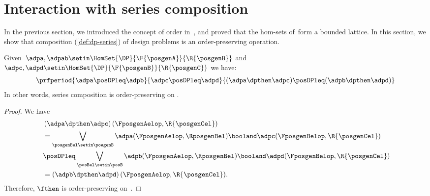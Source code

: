 
\section{Interaction with series composition}
In the previous section, we introduced the concept of order in~\DP, and proved that the hom-sets of~\DP form a bounded lattice.
In this section, we show that composition (\cref{def:dp-series}) of design problems is an order-preserving operation.

\begin{lemma}
    \label{lem:series_pres_order}
    Given~$\adpa,\adpab \setin \HomSet{\DP}{\F{\posgenA}}{\R{\posgenB}}$ and~$\adpc,\adpd \setin \HomSet{\DP}{\F{\posgenB}}{\R{\posgenC}}$ we have:
    \begin{equation}
        \prfperiod{
            \adpa\posDPleq \adpb
        }{
            \adpc\posDPleq \adpd
        }{
            (\adpa\dpthen \adpc) \posDPleq (\adpb\dpthen \adpd)
        }
    \end{equation}
    In other words, series composition is order-preserving on \DP.
\end{lemma}

\begin{proof}
    We have
    \begin{equation}
        \label{eq:series_pres_ord}
        \begin{aligned}
            ~ & \left( \adpa\dpthen \adpc\right)(\FposgenAelop,\R{\posgenCel}) \\
              & = \bigvee_{\posgenBel\setin \posgenB}\adpa(\FposgenAelop,\RposgenBel)\booland \adpc(\FposgenBelop,\R{\posgenCel}) \\
              & \posDPleq \bigvee_{\posBel\setin \posB} \adpb(\FposgenAelop,\RposgenBel)\booland \adpd(\FposgenBelop,\R{\posgenCel}) \\
              & =\left( \adpb\dpthen \adpd\right)(\FposgenAelop,\R{\posgenCel}).
        \end{aligned}
    \end{equation}
    Therefore, $\fthen$ is order-preserving on~\DP.
\end{proof}

